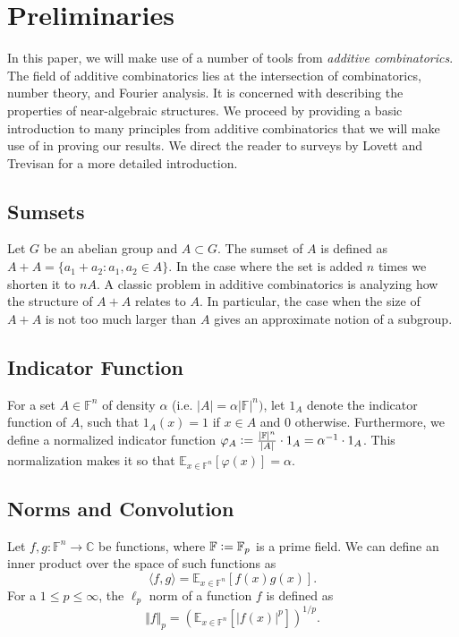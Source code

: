 \documentclass[12pt]{caltech_thesis}
\newcommand{\defeq}{\vcentcolon=}
\def\F{\mathbb{F}}
\def\E{\mathbb{E}}
\def\C{\mathbb{C}}
\renewcommand{\phi}{\varphi}
\begin{document}
\chapter{Preliminaries}

In this paper, we will make use of a number of tools from \textit{additive combinatorics}. The field of additive combinatorics lies at the intersection of combinatorics, number theory, and Fourier analysis. It is concerned with describing the properties of near-algebraic structures. We proceed by providing a basic introduction to many principles from additive combinatorics that we will make use of in proving our results.  We direct the reader to surveys by Lovett \cite{Lovett2017} and Trevisan \cite{Trevisan2009} for a more detailed introduction. 

\section{Sumsets}
Let $G$ be an abelian group and $A \subset G$. The sumset of $A$ is defined as $A+A = \{ a_1 + a_2 : a_1, a_2 \in A\}$.  In the case where the set is added $n$ times we shorten it to $nA$. A classic problem in additive combinatorics is analyzing how the structure of $A+A$ relates to $A$. In particular, the case when the size of $A+A$ is not too much larger than $A$ gives an approximate notion of a subgroup.


\section{Indicator Function}
For a set $A \in \F^n$ of density $\alpha$ (i.e. $|A| = \alpha|\F|^n)$, let $1_A$ denote the indicator function of $A$, such that $1_A(x) = 1$ if $x \in A$ and 0 otherwise. Furthermore, we define a normalized indicator function $\phi_A \defeq \frac{|\F|^n}{|A|}\cdot 1_A = \alpha^{-1}\cdot 1_A$. This normalization makes it so that $\E_{x \in \F^n}[\phi(x)] = \alpha$.

\section{Norms and Convolution}
Let $f, g:\F^n \rightarrow \C$ be functions, where $\F \defeq \F_p$ is a prime field. We can define an inner product over the space of such functions as
\begin{equation*}
    \langle f, g \rangle = \E_{x \in \F^n}[f(x)g(x)].
\end{equation*}
For a $1\leq p \leq \infty$, the $\ell_p$ norm of a function $f$ is defined as 
\begin{equation*}
    \Vert f \Vert_p = \left( \E_{x\in\F^n}[|f(x)|^p] \right)^{1/p}.
\end{equation*}
\end{document}
